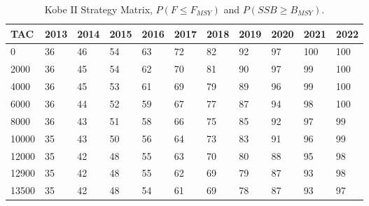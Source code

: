 \documentclass[a4paper, 10pt]{article}
\begin{document}
%
\begin{table}[!tbp]
\caption{Kobe II Strategy Matrix, $P(F\leq F_{MSY})$ and $P(SSB\geq B_{MSY})$.\label{kobeShade}} 
\begin{center}
\begin{tabular}{lllllllllll}
\hline\hline
\multicolumn{1}{l}{TAC}&\multicolumn{1}{c}{2013}&\multicolumn{1}{c}{2014}&\multicolumn{1}{c}{2015}&\multicolumn{1}{c}{2016}&\multicolumn{1}{c}{2017}&\multicolumn{1}{c}{2018}&\multicolumn{1}{c}{2019}&\multicolumn{1}{c}{2020}&\multicolumn{1}{c}{2021}&\multicolumn{1}{c}{2022}\tabularnewline
\hline
0& 36& 46&\cellcolor{gray90} 54&\cellcolor{gray80} 63&\cellcolor{gray70} 72&\cellcolor{gray60} 82&\cellcolor{gray50} 92&\cellcolor{gray50} 97&\cellcolor{gray50} 100&\cellcolor{gray50} 100\tabularnewline
2000& 36& 45&\cellcolor{gray90} 54&\cellcolor{gray80} 62&\cellcolor{gray70} 70&\cellcolor{gray60} 81&\cellcolor{gray50} 90&\cellcolor{gray50} 97&\cellcolor{gray50} 99&\cellcolor{gray50} 100\tabularnewline
4000& 36& 45&\cellcolor{gray90} 53&\cellcolor{gray80} 61&\cellcolor{gray80} 69&\cellcolor{gray70} 79&\cellcolor{gray60} 89&\cellcolor{gray50} 96&\cellcolor{gray50} 99&\cellcolor{gray50} 100\tabularnewline
6000& 36& 44&\cellcolor{gray90} 52&\cellcolor{gray90} 59&\cellcolor{gray80} 67&\cellcolor{gray70} 77&\cellcolor{gray60} 87&\cellcolor{gray50} 94&\cellcolor{gray50} 98&\cellcolor{gray50} 100\tabularnewline
8000& 36& 43&\cellcolor{gray90} 51&\cellcolor{gray90} 58&\cellcolor{gray80} 66&\cellcolor{gray70} 75&\cellcolor{gray60} 85&\cellcolor{gray50} 92&\cellcolor{gray50} 97&\cellcolor{gray50} 99\tabularnewline
10000& 35& 43& 50&\cellcolor{gray90} 56&\cellcolor{gray80} 64&\cellcolor{gray70} 73&\cellcolor{gray60} 83&\cellcolor{gray50} 91&\cellcolor{gray50} 96&\cellcolor{gray50} 99\tabularnewline
12000& 35& 42& 48&\cellcolor{gray90} 55&\cellcolor{gray80} 63&\cellcolor{gray70} 70&\cellcolor{gray70} 80&\cellcolor{gray60} 88&\cellcolor{gray50} 95&\cellcolor{gray50} 98\tabularnewline
12900& 35& 42& 48&\cellcolor{gray90} 55&\cellcolor{gray80} 62&\cellcolor{gray80} 69&\cellcolor{gray70} 79&\cellcolor{gray60} 87&\cellcolor{gray50} 93&\cellcolor{gray50} 98\tabularnewline
13500& 35& 42& 48&\cellcolor{gray90} 54&\cellcolor{gray80} 61&\cellcolor{gray80} 69&\cellcolor{gray70} 78&\cellcolor{gray60} 87&\cellcolor{gray50} 93&\cellcolor{gray50} 97\tabularnewline

\end{tabular}
\end{center}
\end{table}
\end{document}
